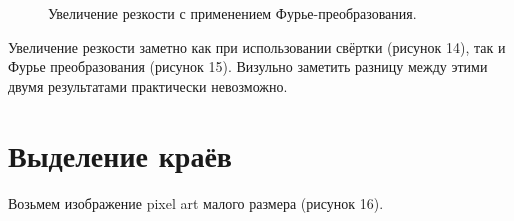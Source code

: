 \documentclass[a5paper, 10pt]{article}
\theoremstyle{definition}
\theoremstyle{plain}
\theoremstyle{remark}
\begin{document}
\begin{figure}[h!]
\caption{Увеличение резкости с применением Фурье-преобразования.}
\end{figure}

\newpage
Увеличение резкости заметно как при использовании свёртки (рисунок 14), так и Фурье преобразования (рисунок 15). Визульно заметить разницу между этими двумя результатами практически невозможно.

\newpage
\section{Выделение краёв}
Возьмем изображение pixel art малого размера (рисунок 16).
\end{document}
